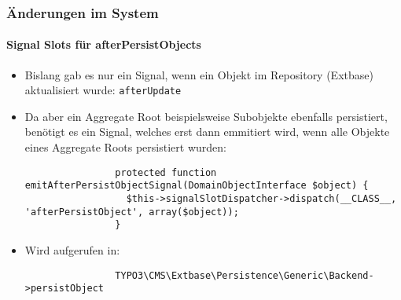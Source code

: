 \begin{frame}[fragile]
	\frametitle{Änderungen im System}
	\framesubtitle{Signal Slots für afterPersistObjects}

	\lstset{
		basicstyle=\tiny\ttfamily
	}

	\begin{itemize}

		\item Bislang gab es nur ein Signal, wenn ein Objekt im Repository (Extbase) aktualisiert wurde: \texttt{afterUpdate}

		\item Da aber ein Aggregate Root beispielsweise Subobjekte ebenfalls persistiert, benötigt es ein Signal,
			welches erst dann emmitiert wird, wenn alle Objekte eines Aggregate Roots persistiert wurden:

			\begin{lstlisting}
				protected function emitAfterPersistObjectSignal(DomainObjectInterface $object) {
				  $this->signalSlotDispatcher->dispatch(__CLASS__, 'afterPersistObject', array($object));
				}
			\end{lstlisting}

		\item Wird aufgerufen in:

			\begin{lstlisting}
				TYPO3\CMS\Extbase\Persistence\Generic\Backend->persistObject
			\end{lstlisting}

	\end{itemize}

\end{frame}


